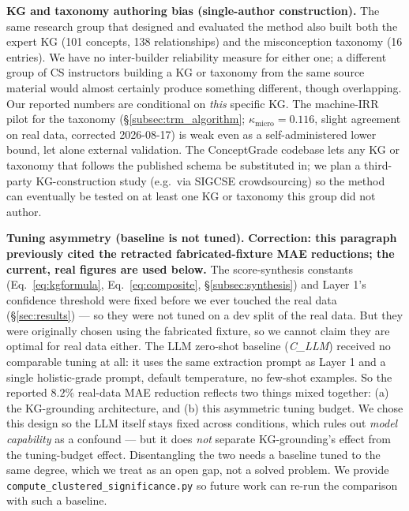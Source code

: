 \documentclass[conference]{IEEEtran}
\begin{document}
\textbf{KG and taxonomy authoring bias (single-author construction).}
The same research group that designed and evaluated the method also
built both the expert KG (101 concepts, 138 relationships) and the
misconception taxonomy (16 entries). We have no inter-builder
reliability measure for either one; a different group of CS
instructors building a KG or taxonomy from the same source material
would almost certainly produce something different, though
overlapping. Our reported numbers are conditional on \emph{this}
specific KG. The machine-IRR pilot for the taxonomy
(\S\ref{subsec:trm_algorithm}; $\kappa_{\text{micro}} = 0.116$,
slight agreement on real data, corrected 2026-08-17) is weak even as
a self-administered lower bound, let alone external validation. The
ConceptGrade codebase lets any KG or taxonomy that follows the
published schema be substituted in; we plan a third-party
KG-construction study (e.g.\ via SIGCSE crowdsourcing) so the method
can eventually be tested on at least one KG or taxonomy this group did
not author.

\textbf{Tuning asymmetry (baseline is not tuned).} \textbf{Correction:
this paragraph previously cited the retracted fabricated-fixture MAE
reductions; the current, real figures are used below.} The
score-synthesis constants (Eq.~\eqref{eq:kgformula},
Eq.~\eqref{eq:composite}, \S\ref{subsec:synthesis}) and Layer 1's
confidence threshold were fixed before we ever touched the real data
(\S\ref{sec:results}) --- so they were not tuned on a dev split of the
real data. But they were originally chosen using the fabricated
fixture, so we cannot claim they are optimal for real data either. The
LLM zero-shot baseline (\textit{C\_LLM}) received no comparable
tuning at all: it uses the same extraction prompt as Layer 1 and a
single holistic-grade prompt, default temperature, no few-shot
examples. So the reported $8.2\%$ real-data MAE reduction reflects two
things mixed together: (a) the KG-grounding architecture, and (b) this
asymmetric tuning budget. We chose this design so the LLM itself stays
fixed across conditions, which rules out \emph{model capability} as a
confound --- but it does \emph{not} separate KG-grounding's effect from
the tuning-budget effect. Disentangling the two needs a baseline tuned
to the same degree, which we treat as an open gap, not a solved
problem. We provide \texttt{compute\_clustered\_significance.py} so
future work can re-run the comparison with such a baseline.
\end{document}

